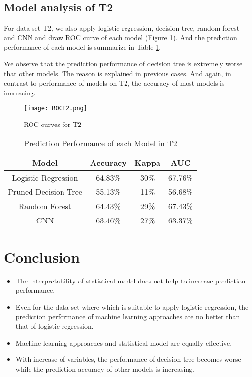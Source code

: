 \documentclass[12pt]{article}
\begin{document}
\subsection{Model analysis of T2}
For data set T2, we also apply logistic regression, decision tree, random forest and CNN and draw ROC curve of each model (Figure \ref{ROCT2}). And the prediction performance of each model is summarize in Table \ref{accuracyT2}.

We observe that the prediction performance of decision tree is extremely worse that other models. The reason is explained in previous cases. And again, in contrast to performance of models on T2, the accuracy of most models is increasing.

\begin{figure}[!htb]
\centering
\caption{ROC curves for T2}
\label{ROCT2}
\texttt{[image: ROCT2.png]}
\end{figure}
\begin{table}
\centering
\caption{Prediction Performance of each Model in T2}
\label{accuracyT2}
\begin{tabular}{|c|c|c|c|}
\hline
 Model & Accuracy & Kappa & AUC \\
\hline
 Logistic Regression & 64.83\% & 30\% & 67.76\% \\
\hline
 Pruned Decision Tree & 55.13\% & 11\% & 56.68\% \\
\hline
 Random Forest & 64.43\% & 29\% & 67.43\% \\
 \hline
 CNN & 63.46\% & 27\% & 63.37\% \\
\hline
\end{tabular}
\end{table}

\newpage

\section{Conclusion}
\begin{itemize}
  \item The Interpretability of statistical model does not help to increase prediction performance.
  \item Even for the data set where which is suitable to apply logistic regression, the prediction performance of machine learning approaches are no better than that of logistic regression.
  \item Machine learning approaches and statistical model are equally effective.
  \item With increase of variables, the performance of decision tree becomes worse while the prediction accuracy of other models is increasing.
\end{itemize}




\end{document}
